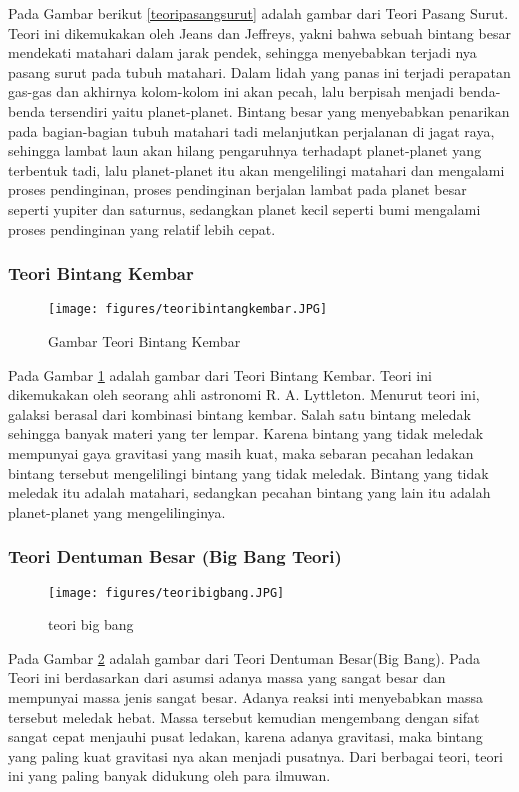Pada Gambar berikut \ref{teoripasangsurut} adalah gambar dari Teori Pasang Surut.
Teori ini dikemukakan oleh Jeans dan Jeffreys, yakni bahwa sebuah bintang besar mendekati matahari dalam jarak pendek, sehingga menyebabkan terjadi nya pasang surut pada tubuh matahari. Dalam lidah yang panas ini terjadi perapatan gas-gas dan akhirnya kolom-kolom ini akan pecah, lalu berpisah menjadi benda-benda tersendiri yaitu planet-planet. Bintang besar yang menyebabkan penarikan pada bagian-bagian tubuh matahari tadi melanjutkan perjalanan di jagat raya, sehingga lambat laun akan hilang pengaruhnya terhadapt planet-planet yang terbentuk tadi, lalu planet-planet itu akan mengelilingi matahari dan mengalami proses pendinginan, proses pendinginan berjalan lambat pada planet besar seperti yupiter dan saturnus, sedangkan planet kecil seperti bumi mengalami proses pendinginan yang relatif lebih cepat.

\subsubsection{Teori Bintang Kembar}
\begin{figure} [ht]
	\centerline{\texttt{[image: figures/teoribintangkembar.JPG]}}
	\caption{Gambar Teori Bintang Kembar}
	\label{teoribintangkembar}
	\end{figure}


Pada Gambar \ref{teoribintangkembar} adalah gambar dari Teori Bintang Kembar.
Teori ini dikemukakan oleh seorang ahli astronomi R. A. Lyttleton. Menurut teori ini, galaksi berasal dari kombinasi bintang kembar. Salah satu bintang meledak sehingga banyak materi yang ter lempar. Karena bintang yang tidak meledak mempunyai gaya gravitasi yang masih kuat, maka sebaran pecahan ledakan bintang tersebut mengelilingi bintang yang tidak meledak. Bintang yang tidak meledak itu adalah matahari, sedangkan pecahan bintang yang lain itu adalah planet-planet yang mengelilinginya.

\subsubsection{Teori Dentuman Besar (Big Bang Teori)}

\begin{figure} [ht]
	\centerline{\texttt{[image: figures/teoribigbang.JPG]}}
	\caption{teori big bang}
	\label{teoribigbang}
	\end{figure}

	
Pada Gambar \ref{teoribigbang} adalah gambar dari Teori Dentuman Besar(Big Bang).
Pada Teori ini berdasarkan dari asumsi adanya massa yang sangat besar dan mempunyai massa jenis sangat besar. Adanya reaksi inti menyebabkan massa tersebut meledak hebat. Massa tersebut kemudian mengembang dengan sifat sangat cepat menjauhi pusat ledakan, karena adanya gravitasi, maka bintang yang paling kuat gravitasi nya akan menjadi pusatnya.
Dari berbagai teori, teori ini yang paling banyak didukung oleh para ilmuwan.


